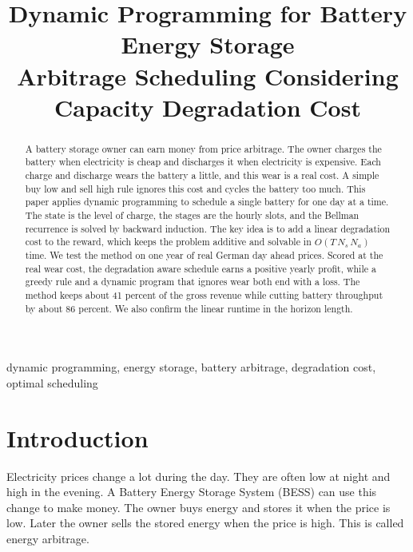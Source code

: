 \documentclass[conference,a4paper]{IEEEtran}
\begin{document}
\title{Dynamic Programming for Battery Energy Storage\\
Arbitrage Scheduling Considering\\
Capacity Degradation Cost}

\author{
}

\maketitle

\begin{abstract}
A battery storage owner can earn money from price arbitrage. The owner
charges the battery when electricity is cheap and discharges it when
electricity is expensive. Each charge and discharge wears the battery a
little, and this wear is a real cost. A simple buy low and sell high rule
ignores this cost and cycles the battery too much. This paper applies
dynamic programming to schedule a single battery for one day at a time. The
state is the level of charge, the stages are the hourly slots, and the
Bellman recurrence is solved by backward induction. The key idea is to add a
linear degradation cost to the reward, which keeps the problem additive and
solvable in $O(T\,N_s\,N_a)$ time. We test the method on one year of real
German day ahead prices. Scored at the real wear cost, the degradation aware
schedule earns a positive yearly profit, while a greedy rule and a dynamic
program that ignores wear both end with a loss. The method keeps about
41 percent of the gross revenue while cutting battery throughput by about
86 percent. We also confirm the linear runtime in the horizon length.
\end{abstract}

\begin{IEEEkeywords}
dynamic programming, energy storage, battery arbitrage, degradation cost,
optimal scheduling
\end{IEEEkeywords}

\section{Introduction}
Electricity prices change a lot during the day. They are often low at night
and high in the evening. A Battery Energy Storage System (BESS) can use this
change to make money. The owner buys energy and stores it when the price is
low. Later the owner sells the stored energy when the price is high. This is
called energy arbitrage.
\end{document}
